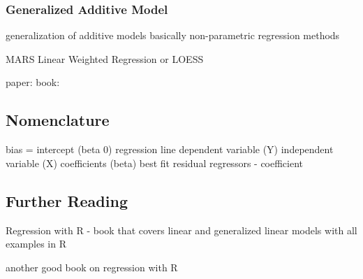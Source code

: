 \begin{bibunit}
\subsubsection{Generalized Additive Model}
generalization of additive models
basically non-parametric regression methods

MARS
Linear Weighted Regression or LOESS

paper: \cite{Hastie1986}
book: \cite{Hastie1990}



\subsection{Nomenclature}

bias = intercept (beta 0)
regression line
dependent variable (Y)
independent variable (X)
coefficients (beta)
best fit
residual
regressors - coefficient


\subsection{Further Reading}


Regression with R - book that covers linear and generalized linear models with all examples in R \cite{Weisberg2010}

another good book on regression with R \cite{Sheather2009}



\putbib
\end{bibunit}

\newpage\begin{bibunit}\putbib\end{bibunit}
\newpage\begin{bibunit}\putbib\end{bibunit}
\newpage\begin{bibunit}\putbib\end{bibunit}
\newpage\begin{bibunit}\putbib\end{bibunit}
\newpage\begin{bibunit}\putbib\end{bibunit}


